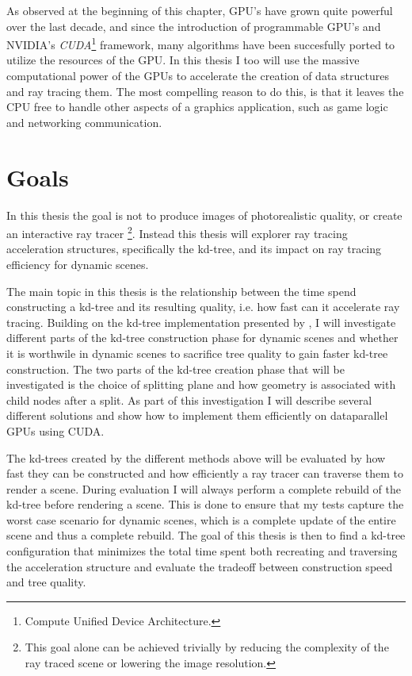 As observed at the beginning of this chapter, GPU's have grown quite powerful
over the last decade, and since the introduction of programmable GPU's and
NVIDIA's \textit{CUDA}\footnote{Compute Unified Device Architecture.}
framework, many algorithms have been succesfully ported to utilize the resources
of the GPU. In this thesis I too will use the massive computational power of the
GPUs to accelerate the creation of data structures and ray tracing them. The
most compelling reason to do this, is that it leaves the CPU free to handle
other aspects of a graphics application, such as game logic and networking
communication.




\section{Goals}

In this thesis the goal is not to produce images of photorealistic quality, or
create an interactive ray tracer \footnote{This goal alone can be achieved
  trivially by reducing the complexity of the ray traced scene or lowering the
  image resolution.}. Instead this thesis will explorer ray tracing acceleration
structures, specifically the kd-tree, and its impact on ray tracing efficiency
for dynamic scenes.

The main topic in this thesis is the relationship between the time spend
constructing a kd-tree and its resulting quality, i.e. how fast can it
accelerate ray tracing. Building on the kd-tree implementation presented by
\zhou{}, I will investigate different parts of the kd-tree construction phase
for dynamic scenes and whether it is worthwile in dynamic scenes to sacrifice
tree quality to gain faster kd-tree construction. The two parts of the kd-tree
creation phase that will be investigated is the choice of splitting plane and
how geometry is associated with child nodes after a split. As part of this
investigation I will describe several different solutions and show how to
implement them efficiently on dataparallel GPUs using CUDA.

The kd-trees created by the different methods above will be evaluated by how
fast they can be constructed and how efficiently a ray tracer can traverse them
to render a scene. During evaluation I will always perform a complete rebuild of
the kd-tree before rendering a scene. This is done to ensure that my tests
capture the worst case scenario for dynamic scenes, which is a complete update
of the entire scene and thus a complete rebuild. The goal of this thesis is then
to find a kd-tree configuration that minimizes the total time spent both
recreating and traversing the acceleration structure and evaluate the tradeoff
between construction speed and tree quality.

